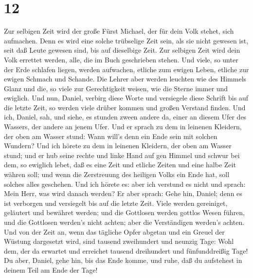 \hypertarget{section-11}{%
\section{12}\label{section-11}}

 Zur selbigen Zeit wird der große Fürst Michael, der für
dein Volk stehet, sich aufmachen. Denn es wird eine solche trübselige
Zeit sein, als sie nicht gewesen ist, seit daß Leute gewesen sind, bis
auf dieselbige Zeit. Zur selbigen Zeit wird dein Volk errettet werden,
alle, die im Buch geschrieben stehen.  Und viele, so unter
der Erde schlafen liegen, werden aufwachen, etliche zum ewigen Leben,
etliche zur ewigen Schmach und Schande.  Die Lehrer aber
werden leuchten wie des Himmels Glanz und die, so viele zur
Gerechtigkeit weisen, wie die Sterne immer und ewiglich. 
Und nun, Daniel, verbirg diese Worte und versiegele diese Schrift bis
auf die letzte Zeit, so werden viele drüber kommen und großen Verstand
finden.  Und ich, Daniel, sah, und siehe, es stunden zween
andere da, einer an diesem Ufer des Wassers, der andere an jenem Ufer.
 Und er sprach zu dem in leinenen Kleidern, der oben am
Wasser stund: Wann will's denn ein Ende sein mit solchen Wundern?
 Und ich hörete zu dem in leinenen Kleidern, der oben am
Wasser stund; und er hub seine rechte und linke Hand auf gen Himmel und
schwur bei dem, so ewiglich lebet, daß es eine Zeit und etliche Zeiten
und eine halbe Zeit währen soll; und wenn die Zerstreuung des heiligen
Volks ein Ende hat, soll solches alles geschehen.  Und ich
hörete es: aber ich verstund es nicht und sprach: Mein Herr, was wird
danach werden?  Er aber sprach: Gehe hin, Daniel; denn es
ist verborgen und versiegelt bis auf die letzte Zeit. 
Viele werden gereiniget, geläutert und bewähret werden; und die
Gottlosen werden gottlos Wesen führen, und die Gottlosen werden's nicht
achten; aber die Verständigen werden's achten.  Und von der
Zeit an, wenn das tägliche Opfer abgetan und ein Greuel der Wüstung
dargesetzt wird, sind tausend zweihundert und neunzig Tage:
 Wohl dem, der da erwartet und erreichet tausend
dreihundert und fünfunddreißig Tage!  Du aber, Daniel, gehe
hin, bis das Ende komme, und ruhe, daß du aufstehest in deinem Teil am
Ende der Tage!
